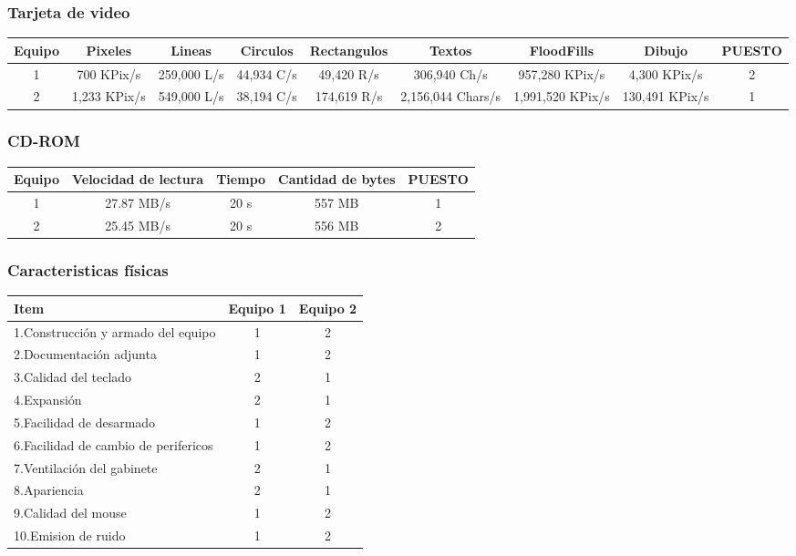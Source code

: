 \subsubsection{Tarjeta de video}
\begin{center}
\begin{tabular}{|ccccccccc|} \hline
\footnotesize\textbf{Equipo} & \footnotesize\textbf{Pixeles} & \footnotesize\textbf{Lineas} & \footnotesize\textbf{Circulos} & \footnotesize\textbf{Rectangulos} & \footnotesize\textbf{Textos} & \footnotesize\textbf{FloodFills} & \footnotesize\textbf{Dibujo} & \footnotesize\textbf{PUESTO} \\\hline
1 & 700 KPix/s & 259,000 L/s & 44,934 C/s & 49,420 R/s & 306,940 Ch/s & 957,280 KPix/s & 4,300 KPix/s & 2 \\\hline
2 & 1,233 KPix/s & 549,000 L/s & 38,194 C/s & 174,619 R/s & 2,156,044 Chars/s & 1,991,520 KPix/s & 130,491 KPix/s & 1 \\\hline
\end{tabular}
\end{center}

\subsubsection{CD-ROM}
\begin{center}
\begin{tabular}{|ccccc|} \hline
\footnotesize\textbf{Equipo} & \footnotesize\textbf{Velocidad de lectura} & \footnotesize\textbf{Tiempo} & \footnotesize\textbf{Cantidad de bytes} & \footnotesize\textbf{PUESTO} \\\hline
1 & 27.87 MB/s & 20 s & 557 MB & 1 \\\hline
2 & 25.45 MB/s & 20 s & 556 MB & 2 \\\hline
\end{tabular}
\end{center}

\subsubsection{Caracteristicas físicas}
\begin{center}
\begin{tabular}{|lcc|} \hline
\footnotesize\textbf{Item} & \footnotesize\textbf{Equipo 1} & \footnotesize\textbf{Equipo 2} \\\hline
1.Construcción y armado del equipo & 1 & 2 \\\hline
2.Documentación adjunta & 1 & 2 \\\hline
3.Calidad del teclado & 2 & 1 \\\hline
4.Expansión & 2 & 1 \\\hline
5.Facilidad de desarmado & 1 & 2 \\\hline
6.Facilidad de cambio de perifericos & 1 & 2 \\\hline
7.Ventilación del gabinete & 2 & 1 \\\hline
8.Apariencia & 2 & 1 \\\hline
9.Calidad del mouse & 1 & 2 \\\hline
10.Emision de ruido & 1 & 2 \\\hline
\end{tabular}
\end{center}
